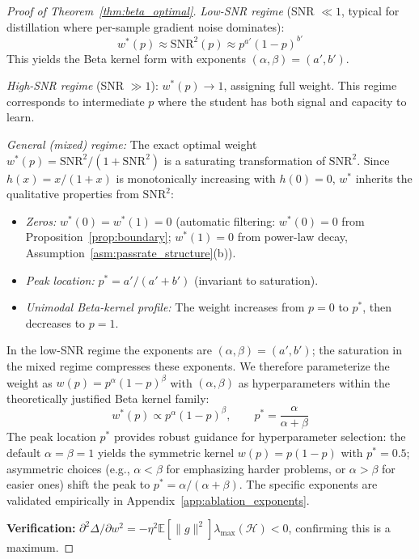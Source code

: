 \documentclass{article}
\begin{document}
\begin{proof}[Proof of Theorem~\ref{thm:beta_optimal}]
\emph{Low-SNR regime} (SNR $\ll 1$, typical for distillation where per-sample gradient noise dominates): 
\begin{equation}
  w^*(p) \approx \text{SNR}^2(p) \approx p^{a'}(1-p)^{b'}
\end{equation}
This yields the Beta kernel form with exponents $(\alpha, \beta) = (a', b')$.

\emph{High-SNR regime} (SNR $\gg 1$): $w^*(p) \to 1$, assigning full weight. This regime corresponds to intermediate $p$ where the student has both signal and capacity to learn.

\emph{General (mixed) regime:} The exact optimal weight $w^*(p) = \text{SNR}^2/(1+\text{SNR}^2)$ is a saturating transformation of $\text{SNR}^2$. Since $h(x)=x/(1+x)$ is monotonically increasing with $h(0)=0$, $w^*$ inherits the qualitative properties from $\text{SNR}^2$:
\begin{itemize}
 \item \emph{Zeros:} $w^*(0) = w^*(1) = 0$ (automatic filtering: $w^*(0) = 0$ from Proposition~\ref{prop:boundary}; $w^*(1) = 0$ from power-law decay, Assumption~\ref{asm:passrate_structure}(b)).
 \item \emph{Peak location:} $p^* = a'/(a'+b')$ (invariant to saturation).
 \item \emph{Unimodal Beta-kernel profile:} The weight increases from $p=0$ to $p^*$, then decreases to $p=1$.
\end{itemize}
In the low-SNR regime the exponents are $(\alpha, \beta) = (a', b')$; the saturation in the mixed regime compresses these exponents. We therefore parameterize the weight as $w(p) = p^\alpha(1-p)^\beta$ with $(\alpha, \beta)$ as hyperparameters within the theoretically justified Beta kernel family:
\begin{equation}
  w^*(p) \propto p^{\alpha}(1-p)^{\beta}, \qquad p^* = \frac{\alpha}{\alpha+\beta}
\end{equation}
The peak location $p^*$ provides robust guidance for hyperparameter selection: the default $\alpha = \beta = 1$ yields the symmetric kernel $w(p) = p(1-p)$ with $p^* = 0.5$; asymmetric choices (e.g., $\alpha < \beta$ for emphasizing harder problems, or $\alpha > \beta$ for easier ones) shift the peak to $p^* = \alpha/(\alpha+\beta)$. The specific exponents are validated empirically in Appendix~\ref{app:ablation_exponents}.

\textbf{Verification:} $\partial^2 \Delta / \partial w^2 = -\eta^2 \mathbb{E}[\|g\|^2] \lambda_{\max}(\mathcal{H}) < 0$, confirming this is a maximum.

\end{proof}
\end{document}
